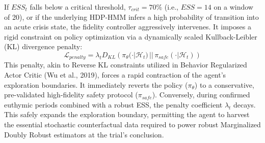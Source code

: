 If $ESS_t$ falls below a critical threshold, $\tau_{crit} = 70\%$ (i.e., $ESS=14$ on a window of 20), or if the underlying HDP-HMM infers a high probability of transition into an acute crisis state, the fidelity controller aggressively intervenes. It imposes a rigid constraint on policy optimization via a dynamically scaled Kullback-Leibler (KL) divergence penalty:
$$\mathcal{L}_{penalty} = \lambda_t D_{KL}\left(\pi_\theta(\cdot | \mathcal{H}_t) \,||\, \pi_{safe}(\cdot | \mathcal{H}_t)\right)$$
This penalty, akin to Reverse KL constraints utilized in Behavior Regularized Actor Critic (Wu et al., 2019), forces a rapid contraction of the agent's exploration boundaries. It immediately reverts the policy ($\pi_\theta$) to a conservative, pre-validated high-fidelity safety protocol ($\pi_{safe}$). Conversely, during confirmed euthymic periods combined with a robust ESS, the penalty coefficient $\lambda_t$ decays. This safely expands the exploration boundary, permitting the agent to harvest the essential stochastic counterfactual data required to power robust Marginalized Doubly Robust estimators at the trial's conclusion.
